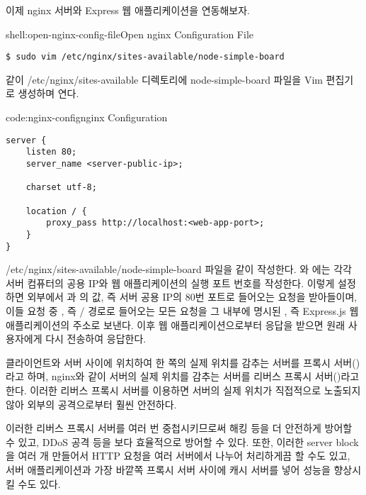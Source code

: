 이제 nginx 서버와 Express 웹 애플리케이션을 연동해보자.

\begin{shellenv}{shell:open-nginx-config-file}{Open nginx Configuration File}\begin{verbatim}
$ sudo vim /etc/nginx/sites-available/node-simple-board
\end{verbatim}
\end{shellenv}

\과 같이 /etc/nginx/sites-available 디렉토리에 node-simple-board 파일을 Vim 편집기로 생성하며 연다.

\begin{codeenv}{code:nginx-config}{nginx Configuration}\begin{verbatim}
server {
    listen 80;
    server_name <server-public-ip>;

    charset utf-8;

    location / {
        proxy_pass http://localhost:<web-app-port>;
    }
}
\end{verbatim}
\end{codeenv}

/etc/nginx/sites-available/node-simple-board 파일을 \와 같이 작성한다. 와 에는 각각 서버 컴퓨터의 공용 IP와 웹 애플리케이션의 실행 포트 번호를 작성한다. 이렇게 설정하면 외부에서 과 의 값, 즉 서버 공용 IP의 80번 포트로 들어오는 요청을 받아들이며, 이들 요청 중 , 즉 / 경로로 들어오는 모든 요청을 그 내부에 명시된 , 즉 Express.js 웹 애플리케이션의 주소로 보낸다. 이후 웹 애플리케이션으로부터 응답을 받으면 원래 사용자에게 다시 전송하여 응답한다.


클라이언트와 서버 사이에 위치하여 한 쪽의 실제 위치를 감추는 서버를 프록시 서버()라고 하며, nginx와 같이 서버의 실제 위치를 감추는 서버를 리버스 프록시 서버()라고 한다. 이러한 리버스 프록시 서버를 이용하면 서버의 실제 위치가 직접적으로 노출되지 않아 외부의 공격으로부터 훨씬 안전하다.

이러한 리버스 프록시 서버를 여러 번 중첩시키므로써 해킹 등을 더 안전하게 방어할 수 있고, DDoS 공격 등을 보다 효율적으로 방어할 수 있다. 또한, 이러한 server block을 여러 개 만들어서 HTTP 요청을 여러 서버에서 나누어 처리하게끔 할 수도 있고, 서버 애플리케이션과 가장 바깥쪽 프록시 서버 사이에 캐시 서버를 넣어 성능을 향상시킬 수도 있다.

